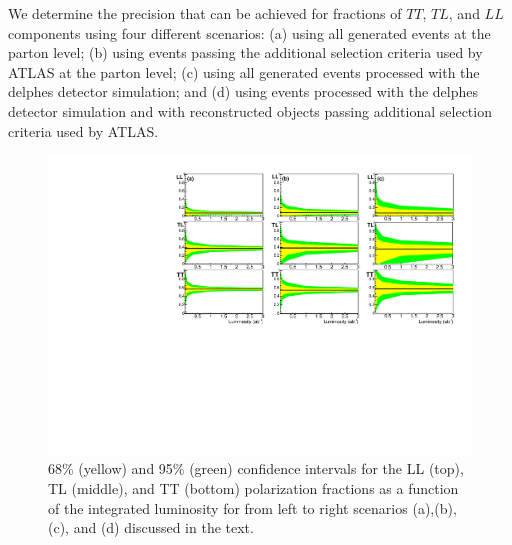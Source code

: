 We determine the precision that can be achieved for fractions of $TT$, $TL$, and $LL$ components using four different scenarios: (a) using all  generated events at the parton level; 
(b) using events passing the additional selection criteria used by ATLAS at the parton level; 
(c) using all generated events processed with the {\sc delphes} detector simulation; and (d) using events processed with the {\sc delphes} detector simulation and with reconstructed objects passing additional selection criteria used by \mbox{ATLAS}. 

\begin{figure}
\includegraphics[width=.9\textwidth]{./fig/12_LL_LT_TT.pdf}
\caption{ \label{fig:sensitivity} 68\% (yellow) and 95\% (green) confidence intervals for the LL (top), TL (middle), and TT (bottom) polarization fractions as a function of the integrated luminosity for from left to right scenarios (a),(b),(c), and (d) discussed in the text. }
\end{figure}

